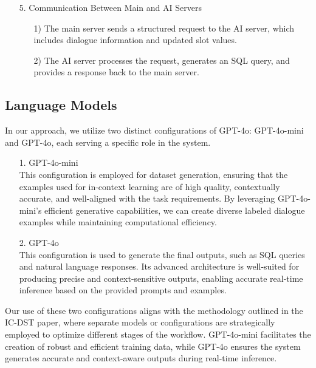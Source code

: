 \documentclass[conference]{IEEEtran}
\begin{document}
\begin{enumerate}
\item[5.] Communication Between Main and AI Servers
\begin{itemize}
    \item[1)] The main server sends a structured request to the AI server, which includes dialogue information and updated slot values.
    \item[2)] The AI server processes the request, generates an SQL query, and provides a response back to the main server.
\end{itemize} 
\end{enumerate}


\subsection{Language Models}

In our approach, we utilize two distinct configurations of GPT-4o: GPT-4o-mini and GPT-4o, each serving a specific role in the system. \\ 

\begin{enumerate}
    \item[1.] GPT-4o-mini \\
    This configuration is employed for dataset generation, ensuring that the examples used for in-context learning are of high quality, contextually accurate, and well-aligned with the task requirements. By leveraging GPT-4o-mini's efficient generative capabilities, we can create diverse labeled dialogue examples while maintaining computational efficiency. \\ 

    \item[2.] GPT-4o \\
    This configuration is used to generate the final outputs, such as SQL queries and natural language responses. Its advanced architecture is well-suited for producing precise and context-sensitive outputs, enabling accurate real-time inference based on the provided prompts and examples. \\
    
\end{enumerate}

Our use of these two configurations aligns with the methodology outlined in the IC-DST paper, where separate models or configurations are strategically employed to optimize different stages of the workflow. GPT-4o-mini facilitates the creation of robust and efficient training data, while GPT-4o ensures the system generates accurate and context-aware outputs during real-time inference. \\ \\ \\ \\ \\ \\ \\
\end{document}
